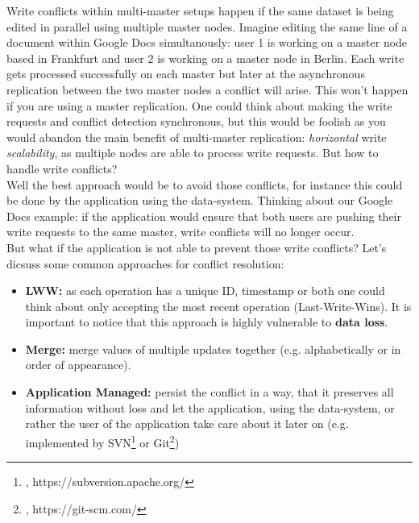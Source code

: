 {
Write conflicts within multi-master setups happen if the same dataset is being edited in parallel using multiple master nodes. Imagine editing the same line of a document within Google Docs simultanously: user 1 is working on a master node based in Frankfurt and user 2 is working on a master node in Berlin. Each write gets processed successfully on each master but later at the asynchronous replication between the two master nodes a conflict will arise. This won't happen if you are using a master replication. One could think about making the write requests and conflict detection synchronous, but this would be foolish as you would abandon the main benefit of multi-master replication: \textit{horizontal} write \textit{scalability}, as multiple nodes are able to process write requests. But how to handle write conflicts?\\
Well the best approach would be to avoid those conflicts, for instance this could be done by the application using the data-system. Thinking about our Google Docs example: if the application would ensure that both users are pushing their write requests to the same master, write conflicts will no longer occur.\\
But what if the application is not able to prevent those write conflicts? Let's dicsuss some common approaches for conflict resolution:\\

\begin{itemize}
\item \textbf{LWW:} as each operation has a unique ID, timestamp or both one could think about only accepting the most recent operation (Last-Write-Wins). It is important to notice that this approach is highly vulnerable to \textbf{data loss}.
\item \textbf{Merge:} merge values of multiple updates together (e.g. alphabetically or in order of appearance).
\item \textbf{Application Managed:} persist the conflict in a way, that it preserves all information without loss and let the application, using the data-system, or rather the user of the application take care about it later on (e.g. implemented by SVN\footnote{\cite{SVNWS}, https://subversion.apache.org/} or Git\footnote{\cite{GITWS}, https://git-scm.com/})
\end{itemize}


}
